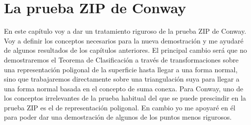 \documentclass[10pt]{report}
\theoremstyle{definition}
\begin{document}

\chapter{La prueba ZIP de Conway}

En este capítulo voy a dar un tratamiento riguroso de la prueba ZIP de Conway. Voy a definir los conceptos necesarios para la nueva demostración y me ayudaré de algunos resultados de los capítulos anteriores. El principal cambio será que no demostraremos el Teorema de Clasificación a través de transformaciones sobre una representación poligonal de la superficie hasta llegar a una forma normal, sino que trabajaremos directamente sobre una triangulación suya para llegar a una forma normal basada en el concepto de suma conexa. Para Conway, uno de los conceptos irrelevantes de la prueba habitual del que se puede prescindir en la prueba ZIP es el de representación poligonal. En cambio yo me apoyaré en él para poder dar una demostración de algunos de los puntos menos rigurosos.
\end{document}
